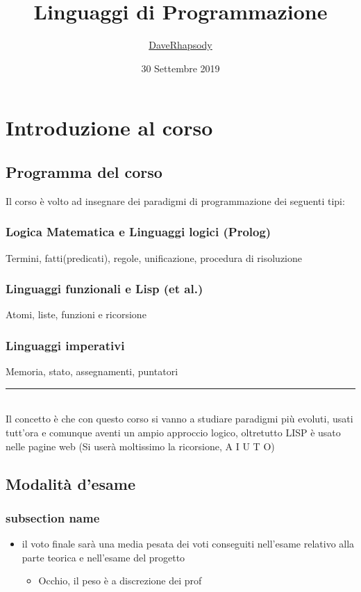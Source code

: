 \documentclass[12pt, a4paper, openany, oneside]{book}
\begin{document}
\selectfont
\author{\href{https://github.com/daverhapsody}{DaveRhapsody}}
\title{Linguaggi di Programmazione}
\color{blue}
\date{30 Settembre 2019}
\color{black}
\maketitle
\tableofcontents
\chapter{Introduzione al corso}
\section{Programma del corso}
Il corso è volto ad insegnare dei paradigmi di programmazione dei seguenti tipi:
\subsection{Logica Matematica e Linguaggi logici (Prolog)}
Termini, fatti(predicati), regole, unificazione, procedura di risoluzione
\subsection{Linguaggi funzionali e Lisp (et al.)}
Atomi, liste, funzioni e ricorsione
\subsection{Linguaggi imperativi}
\label{sub:linguaggi_imperativi}
Memoria, stato, assegnamenti, puntatori
\\ 
{\color{black} \rule{\linewidth}{0.3mm} }
\\
Il concetto è che con questo corso si vanno a studiare paradigmi più evoluti,
usati tutt'ora e comunque aventi un ampio approccio logico, oltretutto LISP è 
usato nelle pagine web (Si userà moltissimo la ricorsione, A I U T O)
\section{Modalità d'esame}
\label{sec:modalità_d_esame}
\subsection{subsection name}
\label{sub:subsection_name}
\begin{itemize}
	\item il voto finale sarà una media pesata dei voti conseguiti nell'esame 
	relativo alla parte teorica e nell'esame del progetto 
	\begin{itemize}
		\item Occhio, il peso è a discrezione dei prof
	\end{itemize}
\end{itemize}
\end{document}
